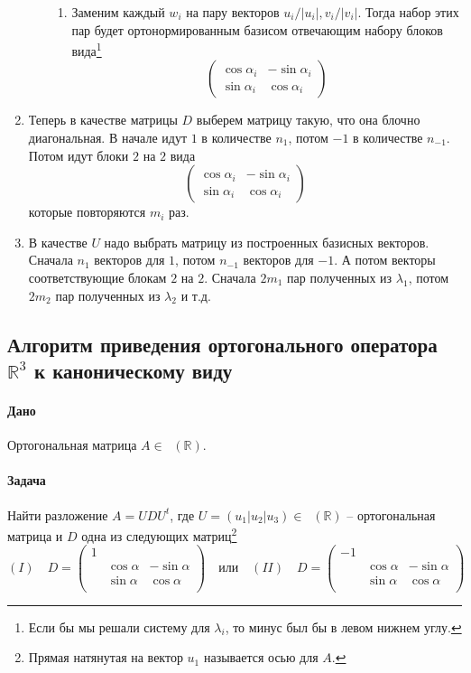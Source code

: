 \documentclass{article}
\newcommand{\Matrix}[2]{\mathop{\mathrm{M}_{#2}}(#1)}
\begin{document}
\begin{enumerate}
\begin{enumerate}
\begin{enumerate}
\item Заменим каждый $w_i$ на пару векторов $u_i/|u_i|, v_i/|v_i|$. Тогда набор этих пар будет ортонормированным базисом отвечающим набору блоков вида\footnote{Если бы мы решали систему для $\lambda_i$, то минус был бы в левом нижнем углу.}
\[
\begin{pmatrix}
{\cos \alpha_i}&{-\sin\alpha_i}\\
{\sin \alpha_i}&{\cos \alpha_i}
\end{pmatrix}
\]
\end{enumerate}
\end{enumerate}
\item Теперь в качестве матрицы $D$ выберем матрицу такую, что она блочно диагональная. В начале идут $1$ в количестве $n_1$, потом $-1$ в количестве $n_{-1}$. Потом идут блоки $2$ на $2$ вида
\[
\begin{pmatrix}
{\cos \alpha_i}&{-\sin\alpha_i}\\
{\sin \alpha_i}&{\cos \alpha_i}
\end{pmatrix}
\]
которые повторяются $m_i$ раз.

\item В качестве $U$ надо выбрать матрицу из построенных базисных векторов. Сначала $n_1$ векторов для $1$, потом $n_{-1}$ векторов для $-1$. А потом векторы соответствующие блокам $2$ на $2$. Сначала $2m_1$ пар полученных из $\lambda_1$, потом $2m_2$ пар полученных из $\lambda_2$ и т.д.
\end{enumerate}

\subsection{Алгоритм приведения ортогонального оператора $\mathbb R^3$ к каноническому виду}

\paragraph{Дано} Ортогональная матрица $A\in\Matrix{\mathbb R}{3}$.

\paragraph{Задача} Найти разложение $A = U D U^t$, где $U=(u_1|u_2|u_3)\in\Matrix{\mathbb R}{3}$ -- ортогональная матрица и $D$ одна из следующих матриц\footnote{Прямая натянутая на вектор $u_1$ называется осью для $A$.}
\[
(I)\quad D =
\begin{pmatrix}
{1}&{}&{}\\
{}&{\cos \alpha}&{-\sin\alpha}\\
{}&{\sin\alpha}&{\cos\alpha}\\
\end{pmatrix}
\quad\text{или}\quad
(II)\quad D =
\begin{pmatrix}
{-1}&{}&{}\\
{}&{\cos \alpha}&{-\sin\alpha}\\
{}&{\sin\alpha}&{\cos\alpha}\\
\end{pmatrix}
\]
\end{document}
